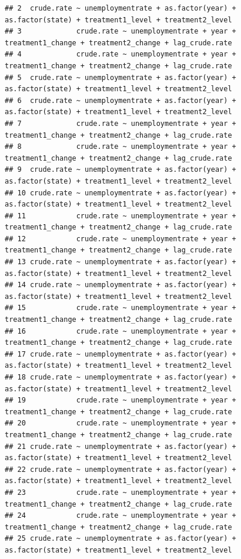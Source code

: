 \documentclass[
]{article}
\begin{document}
\begin{verbatim}
## 2  crude.rate ~ unemploymentrate + as.factor(year) + as.factor(state) + treatment1_level + treatment2_level
## 3             crude.rate ~ unemploymentrate + year + treatment1_change + treatment2_change + lag_crude.rate
## 4             crude.rate ~ unemploymentrate + year + treatment1_change + treatment2_change + lag_crude.rate
## 5  crude.rate ~ unemploymentrate + as.factor(year) + as.factor(state) + treatment1_level + treatment2_level
## 6  crude.rate ~ unemploymentrate + as.factor(year) + as.factor(state) + treatment1_level + treatment2_level
## 7             crude.rate ~ unemploymentrate + year + treatment1_change + treatment2_change + lag_crude.rate
## 8             crude.rate ~ unemploymentrate + year + treatment1_change + treatment2_change + lag_crude.rate
## 9  crude.rate ~ unemploymentrate + as.factor(year) + as.factor(state) + treatment1_level + treatment2_level
## 10 crude.rate ~ unemploymentrate + as.factor(year) + as.factor(state) + treatment1_level + treatment2_level
## 11            crude.rate ~ unemploymentrate + year + treatment1_change + treatment2_change + lag_crude.rate
## 12            crude.rate ~ unemploymentrate + year + treatment1_change + treatment2_change + lag_crude.rate
## 13 crude.rate ~ unemploymentrate + as.factor(year) + as.factor(state) + treatment1_level + treatment2_level
## 14 crude.rate ~ unemploymentrate + as.factor(year) + as.factor(state) + treatment1_level + treatment2_level
## 15            crude.rate ~ unemploymentrate + year + treatment1_change + treatment2_change + lag_crude.rate
## 16            crude.rate ~ unemploymentrate + year + treatment1_change + treatment2_change + lag_crude.rate
## 17 crude.rate ~ unemploymentrate + as.factor(year) + as.factor(state) + treatment1_level + treatment2_level
## 18 crude.rate ~ unemploymentrate + as.factor(year) + as.factor(state) + treatment1_level + treatment2_level
## 19            crude.rate ~ unemploymentrate + year + treatment1_change + treatment2_change + lag_crude.rate
## 20            crude.rate ~ unemploymentrate + year + treatment1_change + treatment2_change + lag_crude.rate
## 21 crude.rate ~ unemploymentrate + as.factor(year) + as.factor(state) + treatment1_level + treatment2_level
## 22 crude.rate ~ unemploymentrate + as.factor(year) + as.factor(state) + treatment1_level + treatment2_level
## 23            crude.rate ~ unemploymentrate + year + treatment1_change + treatment2_change + lag_crude.rate
## 24            crude.rate ~ unemploymentrate + year + treatment1_change + treatment2_change + lag_crude.rate
## 25 crude.rate ~ unemploymentrate + as.factor(year) + as.factor(state) + treatment1_level + treatment2_level

\end{verbatim}
\end{document}
